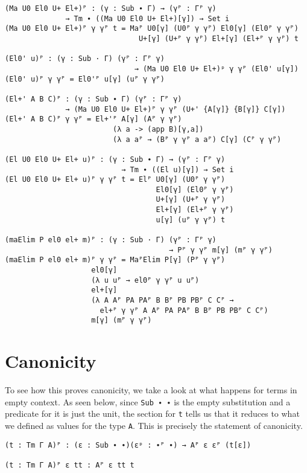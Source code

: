 \begin{verbatim}
(Ma U0 El0 U+ El+)ᴾ : (γ : Sub ∙ Γ) → (γᴾ : Γᴾ γ)
              → Tm ∙ ((Ma U0 El0 U+ El+)[γ]) → Set i
(Ma U0 El0 U+ El+)ᴾ γ γᴾ t = Maᴾ U0[γ] (U0ᴾ γ γᴾ) El0[γ] (El0ᴾ γ γᴾ)
                               U+[γ] (U+ᴾ γ γᴾ) El+[γ] (El+ᴾ γ γᴾ) t

(El0' u)ᴾ : (γ : Sub · Γ) (γᴾ : Γᴾ γ)
                              → (Ma U0 El0 U+ El+)ᵖ γ γᴾ (El0' u[γ])
(El0' u)ᴾ γ γᴾ = El0'ᴾ u[γ] (uᴾ γ γᴾ)

(El+' A B C)ᴾ : (γ : Sub ∙ Γ) (γᴾ : Γᴾ γ)
              → (Ma U0 El0 U+ El+)ᴾ γ γᴾ (U+' {A[γ]} {B[γ]} C[γ])
(El+' A B C)ᴾ γ γᴾ = El+'ᴾ A[γ] (Aᴾ γ γᴾ)
                         (λ a -> (app B)[γ,a])
                         (λ a aᴾ → (Bᴾ γ γᴾ a aᴾ) C[γ] (Cᴾ γ γᴾ)

(El U0 El0 U+ El+ u)ᴾ : (γ : Sub ∙ Γ) → (γᴾ : Γᴾ γ)
                           → Tm ∙ ((El u)[γ]) → Set i
(El U0 El0 U+ El+ u)ᴾ γ γᴾ t = Elᴾ U0[γ] (U0ᴾ γ γᴾ) 
                                   El0[γ] (El0ᴾ γ γᴾ) 
                                   U+[γ] (U+ᴾ γ γᴾ) 
                                   El+[γ] (El+ᴾ γ γᴾ) 
                                   u[γ] (uᴾ γ γᴾ) t

(maElim P el0 el+ m)ᴾ : (γ : Sub · Γ) (γᴾ : Γᴾ γ)
                                      → Pᴾ γ γᴾ m[γ] (mᴾ γ γᴾ)
(maElim P el0 el+ m)ᴾ γ γᴾ = MaᴾElim P[γ] (Pᴾ γ γᴾ)
                    el0[γ]
                    (λ u uᴾ → el0ᴾ γ γᴾ u uᴾ)
                    el+[γ]
                    (λ A Aᴾ PA PAᴾ B Bᴾ PB PBᴾ C Cᴾ →
                      el+ᴾ γ γᴾ A Aᴾ PA PAᴾ B Bᴾ PB PBᴾ C Cᴾ)
                    m[γ] (mᴾ γ γᴾ)
\end{verbatim}

\section{Canonicity}

To see how this proves canonicity, we take a look at what happens for terms in empty context. As seen below, since \texttt{Sub ∙ ∙} is the empty substitution and a predicate for it is just the unit, the section for \texttt{t} tells us that it reduces to what we defined as values for the type \texttt{A}. This is precisely the statement of canonicity.

\begin{verbatim}
(t : Tm Γ A)ᴾ : (ε : Sub ∙ ∙)(εᵖ : ∙ᴾ ∙) → Aᴾ ε εᴾ (t[ε])

(t : Tm Γ A)ᴾ ε tt : Aᴾ ε tt t
\end{verbatim}
